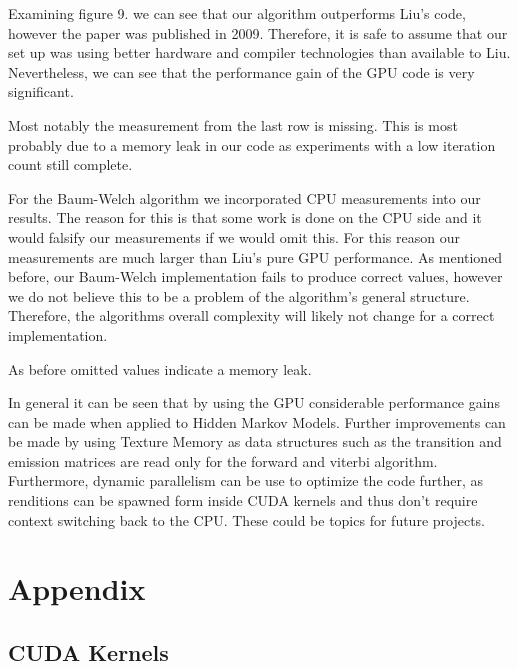 \documentclass[english, paper=a4]{scrartcl}
\begin{document}
Examining figure 9. we can see that our algorithm outperforms Liu's code, however the paper was published in 2009. Therefore, it is safe to assume that our set up was using better hardware and compiler technologies than available to Liu. Nevertheless, we can see that the performance gain of the GPU code is very significant.

Most notably the measurement from the last row is missing. This is most probably due to a memory leak in our code as experiments with a low iteration count still complete.

For the Baum-Welch algorithm we incorporated CPU measurements into our results. The reason for this is that some work is done on the CPU side and it would falsify our measurements if we would omit this. For this reason our measurements are much larger than Liu's pure GPU performance. As mentioned before, our Baum-Welch implementation fails to produce correct values, however we do not believe this to be a problem of the algorithm's general structure. Therefore, the algorithms overall complexity will likely not change for a correct implementation.

As before omitted values indicate a memory leak.

In general it can be seen that by using the GPU considerable performance gains can be made when applied to Hidden Markov Models. Further improvements can be made by using Texture Memory \cite{cuhmm} as data structures such as the transition and emission matrices are read only for the forward and viterbi algorithm. Furthermore, dynamic parallelism can be use to optimize the code further, as renditions can be spawned form inside CUDA kernels and thus don't require context switching back to the CPU. These could be topics for future projects.








\newpage

\section{Appendix}
\subsection{CUDA Kernels}
\end{document}
